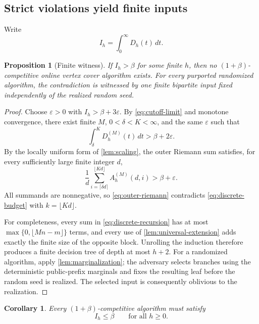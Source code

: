 \documentclass[11pt,letterpaper]{article}
\newcommand{\cref}[1]{\autoref{#1}}
\newtheorem{proposition}[theorem]{Proposition}
\newtheorem{corollary}[theorem]{Corollary}
\theoremstyle{definition}
\theoremstyle{remark}
\begin{document}
\subsection{Strict violations yield finite inputs}

Write
\begin{equation}\label{eq:integral-deficit} I_h=\int_0^{\infty}D_h(t)\,dt. \end{equation}

\begin{proposition}[Finite witness]\label{prop:finite-witness}
If $I_h>\beta$ for some finite $h$, then no $(1+\beta)$-competitive online vertex cover algorithm exists.
For every purported randomized algorithm, the contradiction is witnessed by one finite bipartite input fixed independently of the realized random seed.
\end{proposition}

\begin{proof}
Choose $\varepsilon>0$ with $I_h>\beta+3\varepsilon$.
By \cref{eq:cutoff-limit} and monotone convergence, there exist finite $M$, $0<\delta<K<\infty$, and the same $\varepsilon$ such that
\begin{equation}\label{eq:strict-window} \int_{\delta}^{K}D_h^{(M)}(t)\,dt>\beta+2\varepsilon. \end{equation}
By the locally uniform form of \cref{lem:scaling}, the outer Riemann sum satisfies, for every sufficiently large finite integer $d$,
\begin{equation}\label{eq:outer-riemann} \frac{1}{d}\sum_{i=\lceil\delta d\rceil}^{\lfloor Kd\rfloor}A_h^{(M)}(d,i)>\beta+\varepsilon. \end{equation}
All summands are nonnegative, so \cref{eq:outer-riemann} contradicts \cref{eq:discrete-budget} with $k=\lfloor Kd\rfloor$.

For completeness, every sum in \cref{eq:discrete-recursion} has at most $\max\{0,\lfloor Mn-m\rfloor\}$ terms, and every use of \cref{lem:universal-extension} adds exactly the finite size of the opposite block.
Unrolling the induction therefore produces a finite decision tree of depth at most $h+2$.
For a randomized algorithm, apply \cref{lem:marginalization}; the adversary selects branches using the deterministic public-prefix marginals and fixes the resulting leaf before the random seed is realized.
The selected input is consequently oblivious to the realization.
\end{proof}

\begin{corollary}\label{cor:necessary-integrals}
Every $(1+\beta)$-competitive algorithm must satisfy
\begin{equation}\label{eq:necessary-integrals} I_h\le\beta\qquad\text{for all }h\ge0. \end{equation}
\end{corollary}
\end{document}
